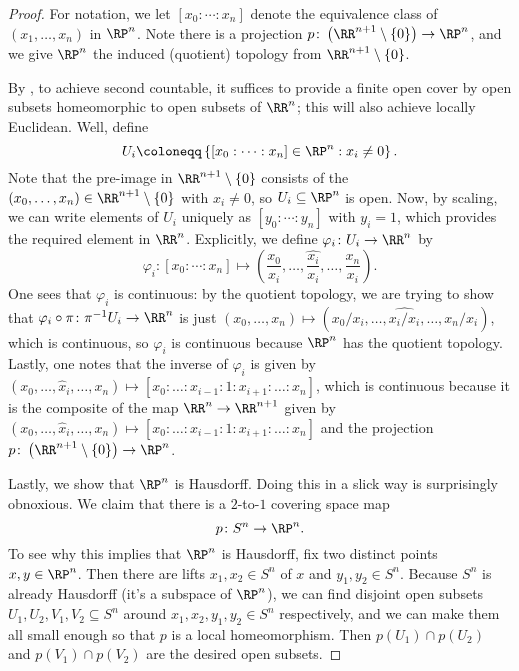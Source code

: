 \documentclass[../notes.tex]{subfiles}
\begin{document}
\begin{proof}
	For notation, we let $[x_0:\cdots:x_n]$ denote the equivalence class of $(x_1,\ldots,x_n)$ in $\RP^n$. Note there is a projection $p\colon\left(\RR^{n+1}\setminus\{0\}\right)\to\RP^n$, and we give $\RP^n$ the induced (quotient) topology from $\RR^{n+1}\setminus\{0\}$.
	
	By , to achieve second countable, it suffices to provide a finite open cover by open subsets homeomorphic to open subsets of $\RR^n$; this will also achieve locally Euclidean. Well, define
	\[U_i\coloneqq\left\{[x_0:\cdots:x_n]\in\RP^n:x_i\ne0\right\}.\]
	Note that the pre-image in $\RR^{n+1}\setminus\{0\}$ consists of the $(x_0,\ldots,x_n)\in\RR^{n+1}\setminus\{0\}$ with $x_i\ne0$, so $U_i\subseteq\RP^n$ is open. Now, by scaling, we can write elements of $U_i$ uniquely as $[y_0:\cdots:y_n]$ with $y_i=1$, which provides the required element in $\RR^n$. Explicitly, we define $\varphi_i\colon U_i\to\RR^n$ by
	\[\varphi_i\colon[x_0:\cdots:x_n]\mapsto\left(\frac{x_0}{x_i},\ldots,\widehat{\frac{x_i}{x_i}},\ldots,\frac{x_n}{x_i}\right).\]
	One sees that $\varphi_i$ is continuous: by the quotient topology, we are trying to show that $\varphi_i\circ\pi\colon\pi^{-1}U_i\to\RR^n$ is just $(x_0,\ldots,x_n)\mapsto(x_0/x_i,\ldots,\widehat{x_i/x_i},\ldots,x_n/x_i)$, which is continuous, so $\varphi_i$ is continuous because $\RP^n$ has the quotient topology. Lastly, one notes that the inverse of $\varphi_i$ is given by $(x_0,\ldots,\widehat x_i,\ldots,x_n)\mapsto[x_0:\ldots:x_{i-1}:1:x_{i+1}:\ldots:x_n]$, which is continuous because it is the composite of the map $\RR^n\to\RR^{n+1}$ given by $(x_0,\ldots,\widehat x_i,\ldots,x_n)\mapsto[x_0:\ldots:x_{i-1}:1:x_{i+1}:\ldots:x_n]$ and the projection $p\colon\left(\RR^{n+1}\setminus\{0\}\right)\to\RP^n$.

	Lastly, we show that $\RP^n$ is Hausdorff. Doing this in a slick way is surprisingly obnoxious. We claim that there is a $2$-to-$1$ covering space map
	\[p\colon S^n\to\RP^n.\]
	To see why this implies that $\RP^n$ is Hausdorff, fix two distinct points $x,y\in\RP^n$. Then there are lifts $x_1,x_2\in S^n$ of $x$ and $y_1,y_2\in S^n$. Because $S^n$ is already Hausdorff (it's a subspace of $\RP^n$), we can find disjoint open subsets $U_1,U_2,V_1,V_2\subseteq S^n$ around $x_1,x_2,y_1,y_2\in S^n$ respectively, and we can make them all small enough so that $p$ is a local homeomorphism. Then $p(U_1)\cap p(U_2)$ and $p(V_1)\cap p(V_2)$ are the desired open subsets.


\end{proof}
\end{document}

